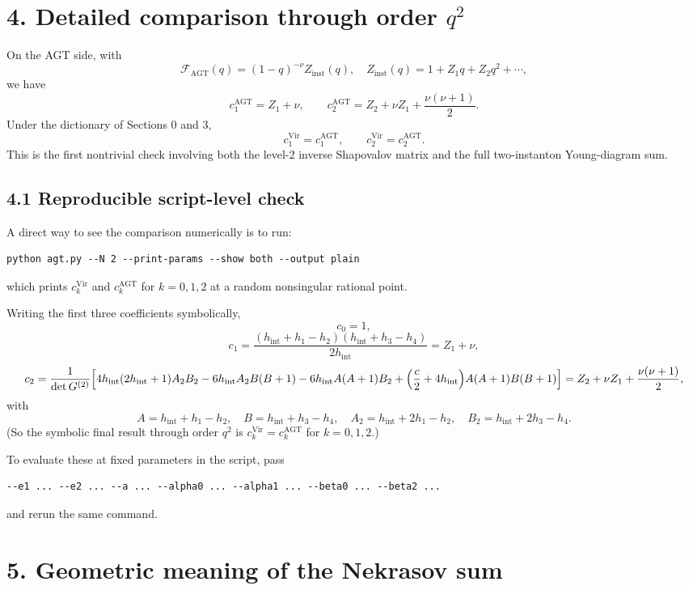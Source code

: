 \documentclass[11pt]{article}
\begin{document}
\section*{4. Detailed comparison through order $q^2$}

On the AGT side, with
\[
\mathcal F_{\mathrm{AGT}}(q)=(1-q)^{-\nu}Z_{\mathrm{inst}}(q),
\quad
Z_{\mathrm{inst}}(q)=1+Z_1q+Z_2q^2+\cdots,
\]
we have
\[
c^{\mathrm{AGT}}_1=Z_1+\nu,\qquad
c^{\mathrm{AGT}}_2=Z_2+\nu Z_1+\frac{\nu(\nu+1)}{2}.
\]
Under the dictionary of Sections 0 and 3,
\[
c^{\mathrm{Vir}}_1=c^{\mathrm{AGT}}_1,\qquad
c^{\mathrm{Vir}}_2=c^{\mathrm{AGT}}_2.
\]
This is the first nontrivial check involving both the level-2 inverse Shapovalov matrix and the full two-instanton Young-diagram sum.

\subsection*{4.1 Reproducible script-level check}

A direct way to see the comparison numerically is to run:
\begin{verbatim}
python agt.py --N 2 --print-params --show both --output plain
\end{verbatim}
which prints $c^{\mathrm{Vir}}_k$ and $c^{\mathrm{AGT}}_k$ for $k=0,1,2$ at a random nonsingular rational point.

Writing the first three coefficients symbolically,
\[
c_0=1,
\]
\[
c_1
=\frac{(h_{\mathrm{int}}+h_1-h_2)(h_{\mathrm{int}}+h_3-h_4)}{2h_{\mathrm{int}}}
=Z_1+\nu,
\]
\[
c_2
=\frac{1}{\det G^{(2)}}\Bigl[
4h_{\mathrm{int}}(2h_{\mathrm{int}}+1)A_2B_2
-6h_{\mathrm{int}}A_2B(B+1)
-6h_{\mathrm{int}}A(A+1)B_2
+\Bigl(\frac c2+4h_{\mathrm{int}}\Bigr)A(A+1)B(B+1)
\Bigr]
=Z_2+\nu Z_1+\frac{\nu(\nu+1)}{2},
\]
with
\[
A=h_{\mathrm{int}}+h_1-h_2,\quad
B=h_{\mathrm{int}}+h_3-h_4,\quad
A_2=h_{\mathrm{int}}+2h_1-h_2,\quad
B_2=h_{\mathrm{int}}+2h_3-h_4.
\]
(So the symbolic final result through order $q^2$ is
$c_k^{\mathrm{Vir}}=c_k^{\mathrm{AGT}}$ for $k=0,1,2$.)

To evaluate these at fixed parameters in the script, pass
\begin{verbatim}
--e1 ... --e2 ... --a ... --alpha0 ... --alpha1 ... --beta0 ... --beta2 ...
\end{verbatim}
and rerun the same command.

\section*{5. Geometric meaning of the Nekrasov sum}
\end{document}
